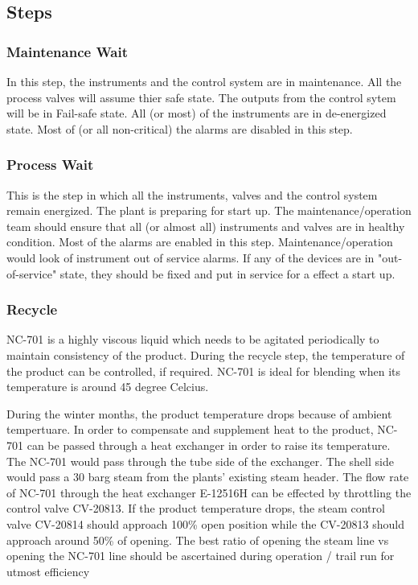 \documentclass[a4paper,oneside]{article}
\begin{document}
\subsection{Steps}
\label{sec:org5231187}
\subsubsection*{Maintenance Wait}
\label{sec:orga2e71ce}
In this step, the instruments and the control system are in
maintenance. All the process valves will assume thier safe state. The
outputs from the control sytem will be in Fail-safe state. All (or
most) of the instruments are in de-energized state. Most of (or all
non-critical) the alarms are disabled in this step.
\subsubsection*{Process Wait}
\label{sec:org3124092}
This is the step in which all the instruments, valves and the control
system remain energized. The plant is preparing for start up. The
maintenance/operation team should ensure that all (or almost all)
instruments and valves are in healthy condition. Most of the alarms
are enabled in this step. Maintenance/operation would look of
instrument out of service alarms. If any of the devices are in
"out-of-service" state, they should be fixed and put in service for a
effect a start up.
\subsubsection*{Recycle}
\label{sec:org800d4db}
NC-701 is a highly viscous liquid which needs to be agitated
periodically to maintain consistency of the product. During the
recycle step, the temperature of the product can be controlled, if
required. NC-701 is ideal for blending when its temperature is around
45 degree Celcius. 

During the winter months, the product temperature drops because of
ambient tempertuare. In order to compensate and supplement heat to the
product, NC-701 can be passed through a heat exchanger in order to
raise its temperature. The NC-701 would pass through the tube side of
the exchanger. The shell side would pass a 30 barg steam from the
plants' existing steam header. The flow rate of NC-701 through the
heat exchanger E-12516H can be effected by throttling the control
valve CV-20813. If the product temperature drops, the steam control
valve CV-20814 should approach 100\% open position while the CV-20813
should approach around 50\% of opening. The best ratio of opening the
steam line vs opening the NC-701 line should be ascertained during
operation / trail run for utmost efficiency
\end{document}
